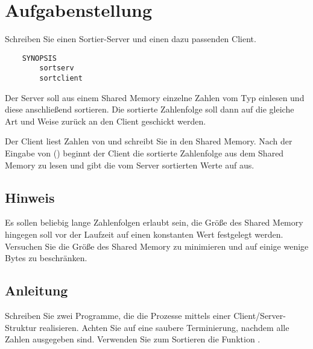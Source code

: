 




\section*{Aufgabenstellung}

Schreiben Sie einen Sortier-Server und einen dazu passenden Client.

\begin{verbatim}
    SYNOPSIS
        sortserv
        sortclient
\end{verbatim}

Der Server soll aus einem Shared Memory einzelne Zahlen vom Typ
 einlesen und diese anschließend sortieren. Die sortierte
Zahlenfolge soll dann auf die gleiche Art und Weise zurück an den Client
geschickt werden.

Der Client liest Zahlen von  und schreibt Sie in den Shared
Memory. Nach der Eingabe von  () beginnt
der Client die sortierte Zahlenfolge aus dem Shared Memory zu lesen und gibt die
vom Server sortierten Werte auf  aus.

\subsection*{Hinweis}
Es sollen beliebig lange Zahlenfolgen erlaubt sein, die Größe des Shared Memory
hingegen soll vor der Laufzeit auf einen konstanten Wert festgelegt werden.
Versuchen Sie die Größe des Shared Memory zu minimieren und auf einige wenige
Bytes zu beschränken.

\subsection*{Anleitung}
Schreiben Sie zwei Programme, die die Prozesse mittels einer
Client/Server-Struktur realisieren. Achten Sie auf eine saubere Terminierung,
nachdem alle Zahlen ausgegeben sind. Verwenden Sie zum Sortieren die Funktion
.

\osueguidelinesthree


